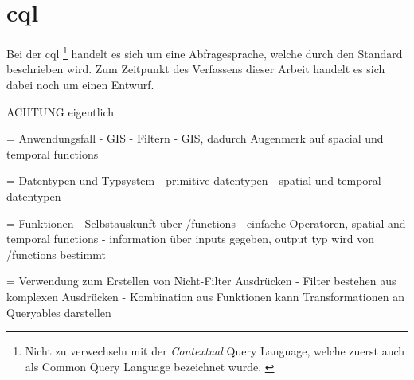 \section{\acl{cql}}

Bei der \acf{cql} \footnote{Nicht zu verwechseln mit der \textit{Contextual} Query Language, welche
zuerst auch als Common Query Language bezeichnet wurde.
\parencite{thelibraryofcongressCQLContextual2023, ZINGGentle2003}} handelt es sich um eine
Abfragesprache, welche durch den Standard  beschrieben
wird. Zum Zeitpunkt des Verfassens dieser Arbeit handelt es sich dabei noch um einen Entwurf.

ACHTUNG eigentlich 

= Anwendungsfall
- GIS
- Filtern
- GIS, dadurch Augenmerk auf spacial und temporal functions

= Datentypen und Typsystem
- primitive datentypen
- spatial und temporal datentypen

= Funktionen
- Selbstauskunft über /functions
- einfache Operatoren, spatial and temporal functions
- information über inputs gegeben, output typ wird von /functions bestimmt

= Verwendung zum Erstellen von Nicht-Filter Ausdrücken
- Filter bestehen aus komplexen Ausdrücken
- Kombination aus Funktionen kann Transformationen an Queryables darstellen
